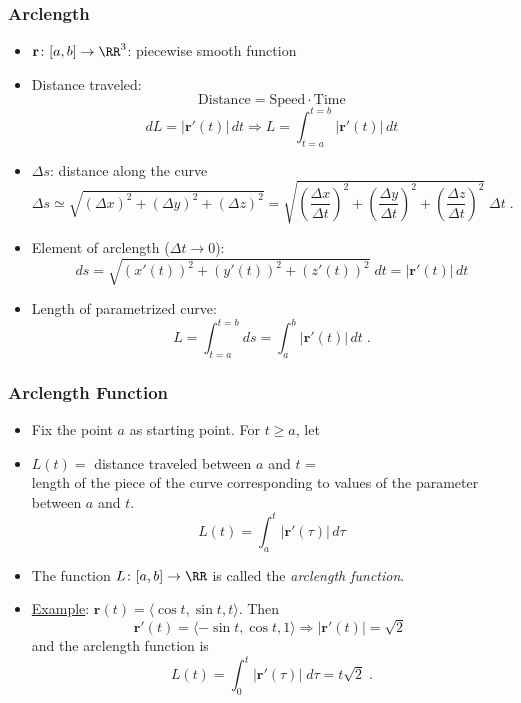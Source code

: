 \begin{frame}
  \frametitle{Arclength}

  \begin{itemize}
    \item $\textbf{r}\colon [a,b] \to \RR^3$: piecewise smooth function
    \item Distance traveled:
    $$\text{Distance} = \text{Speed} \cdot \text{Time}$$
    $$dL = |\textbf{r}'(t)| \, dt \Longrightarrow L = \int_{t=a}^{t=b} |\textbf{r}'(t)| \, dt$$

    \item $\Delta s$: distance along the curve
    $$\Delta s \simeq \sqrt{(\Delta x)^2 + (\Delta y)^2 +
(\Delta z)^2} = \sqrt{\left(\frac{\Delta x}{\Delta t}
\right)^2 + \left(\frac{\Delta y}{\Delta t}\right)^2 +
\left(\frac{\Delta z}{\Delta t}\right)^2} \; \Delta t
\; .$$
%
\item Element of arclength ($\Delta t \to 0$):
%
$$ds = \sqrt{(x'(t))^2 + (y'(t))^2 + (z'(t))^2} \;
dt = |\textbf{r}'(t)| \, dt$$
%
\item Length of parametrized curve:
%
$$L = \int_{t=a}^{t=b} ds = \int_a^b |\textbf{r}'(t)| \, dt\; .$$
  \end{itemize}
\end{frame}

\begin{frame}
  \frametitle{Arclength Function}

  \begin{itemize}
    \item Fix the point $a$ as starting point. For $t \geqslant a$, let
\item $L(t) = $ distance traveled between $a$ and $t$ = \\
length of the piece of the curve corresponding
to values of the parameter between $a$ and $t$.
%
$$L(t) =  \int_{a}^t |\textbf{r}'(\tau)| \, d\tau $$
%
\item The function $L\colon [a,b]\to \RR$ is called the
\emph{arclength function}.
%
\item \underline{Example}: $\textbf{r}(t) = \langle \cos{t}, \sin{t}, t\rangle$.
Then
%
$$\textbf{r}'(t) = \langle -\sin{t}, \cos{t}, 1 \rangle
\Longrightarrow |\textbf{r}'(t)| = \sqrt{2}\; $$
%
and the arclength function is
%
$$L(t) = \int_0^t |\textbf{r}'(\tau)| \; d\tau = t\sqrt{2} \; .$$
  \end{itemize}

\end{frame}

